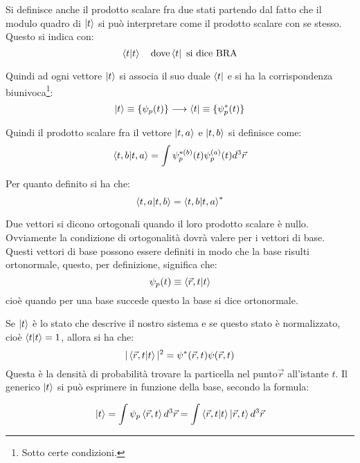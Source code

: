 Si definisce anche il prodotto scalare fra due stati partendo dal fatto che il
modulo quadro di $\ket{t}$ si può interpretare come il prodotto scalare con se
stesso. Questo si indica con:
\begin{equation}
\braket{t|t} \quad \text{dove} \bra{t} \text{  si dice BRA}
\end{equation}

Quindi ad ogni vettore $\ket{t}$ si associa il suo duale $\bra{t}$ e si ha la
corrispondenza biunivoca\footnote{Sotto certe condizioni. }:
\begin{equation}
\ket{t}\equiv \{\psi_{p}(t)\}\longrightarrow \bra{t} \equiv\{\psi^*_{p}(t)\}
\end{equation}

Quindi il prodotto scalare fra il vettore $\ket{t,a}$ e $\ket{t,b}$ si definisce
come:
\begin{equation}
\braket{t,b|t,a}=\int\psi^{*(b)}_p(t)\psi^{(a)}_p(t) d^3\vec{r}
\end{equation}

Per quanto definito si ha che:
\begin{equation}
\braket{t,a|t,b}=\braket{t,b|t,a}^*
\end{equation}

Due vettori si dicono ortogonali quando il loro prodotto scalare è nullo.
Ovviamente la condizione di ortogonalità dovrà valere per i vettori di base.
Questi vettori di base possono essere definiti in modo che la base risulti
ortonormale, questo, per definizione, significa che:
\begin{equation}
\psi_p(t)\equiv \braket{\vec{r},t|t}
\end{equation}
cioè quando per una base succede questo la base si dice ortonormale.

Se $\ket{t}$ è lo stato che descrive il nostro sistema e se questo stato è
normalizzato, cioè $\braket{t|t}=1$, allora si ha che:
\begin{equation}
|\braket{\vec{r},t|t}|^2=\psi^*(\vec{r},t)\psi(\vec{r},t)
\end{equation}
Questa è la densità di probabilità trovare la particella nel punto$\vec{r}$
all'istante $t$. Il generico $\ket{t}$
 si può esprimere in funzione della base, secondo la formula:
 
\begin{equation}
\ket{t}= 
\int{\psi_{p}\braket{\vec{r},t}d^3\vec{r}}=\int{\braket{\vec{r},t|t}}\ket{\vec{r
},t}d^3\vec{r}
\end{equation}

